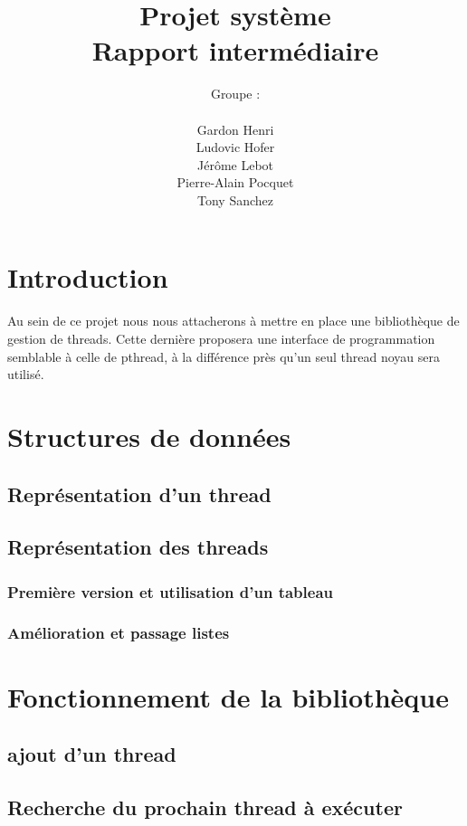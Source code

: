 \documentclass{article}
\author{Groupe :\\ \\Gardon Henri\\Ludovic Hofer\\Jérôme Lebot\\Pierre-Alain Pocquet\\Tony Sanchez}
\title{Projet système \\ Rapport intermédiaire}
\begin{document}
	\maketitle



	\section{Introduction}

		Au sein de ce projet nous nous attacherons à mettre en place une bibliothèque de gestion de threads. Cette dernière proposera une interface de programmation semblable à celle de pthread, à la différence près qu'un seul thread noyau sera utilisé.

	\section{Structures de données}

	\subsection{Représentation d'un thread}

	\subsection{Représentation des threads}

	\subsubsection{Première version et utilisation d'un tableau}

	\subsubsection{Amélioration et passage listes}

	\section{Fonctionnement de la bibliothèque}

	\subsection{ajout d'un thread}

	\subsection{Recherche du prochain thread à exécuter}
\end{document}
